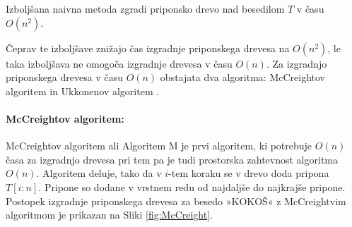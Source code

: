 \begin{izr}\label{izr:naivnaIzbolsana}
    Izboljšana naivna metoda zgradi priponsko drevo nad besedilom $T$ v času $O(n^2)$.
\end{izr}

%

Čeprav te izboljšave znižajo čas izgradnje priponskega drevesa na $O(n^2)$, le taka izboljšava ne omogoča izgradnje drevesa v času $O(n)$. Za izgradnjo priponskega drevesa v času $O(n)$ obstajata dva algoritma: McCreightov algoritem \cite{McCreight1976} in Ukkonenov algoritem \cite{Ukkonen1995}. 

\paragraph{McCreightov algoritem:}
McCreightov algoritem ali Algoritem M je prvi algoritem, ki potrebuje $O(n)$ časa za izgradnjo drevesa pri tem pa je tudi prostorska zahtevnost algoritma $O(n)$.
Algoritem deluje, tako da v $i$-tem koraku se v drevo doda pripona $T[i:n]$. Pripone so dodane v vrstnem redu od najdaljše do najkrajše pripone. Postopek izgradnje priponskega drevesa za besedo »KOKOŠ« z McCreightvim algoritmom je prikazan na Sliki \ref{fig:McCreight}.

